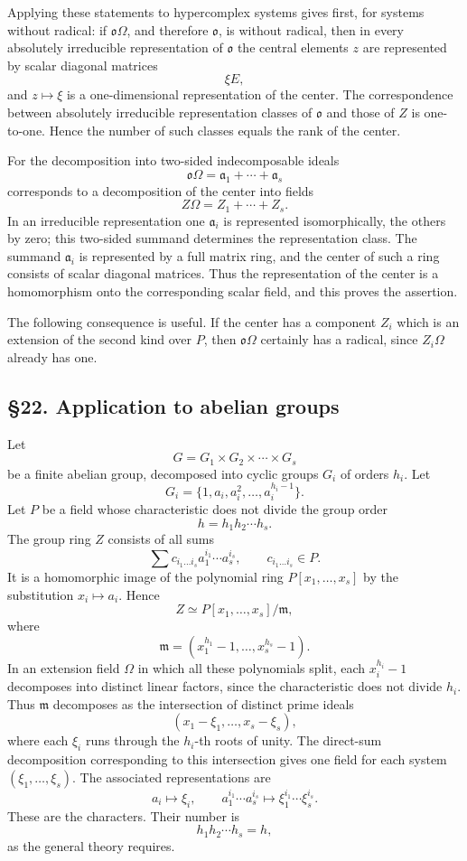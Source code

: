 \documentclass[
  11pt,
]{article}
\begin{document}
Applying these statements to hypercomplex systems gives first, for
systems without radical: if \(\mathfrak{o}\Omega\), and therefore
\(\mathfrak{o}\), is without radical, then in every absolutely
irreducible representation of \(\mathfrak{o}\) the central elements
\(z\) are represented by scalar diagonal matrices \[
  \xi E,
\] and \(z\mapsto \xi\) is a one-dimensional representation of the
center. The correspondence between absolutely irreducible representation
classes of \(\mathfrak{o}\) and those of \(Z\) is one-to-one. Hence the
number of such classes equals the rank of the center.

For the decomposition into two-sided indecomposable ideals \[
  \mathfrak{o}\Omega=\mathfrak a_1+\cdots+\mathfrak a_s
\] corresponds to a decomposition of the center into fields \[
  Z\Omega=Z_1+\cdots+Z_s.
\] In an irreducible representation one \(\mathfrak a_i\) is represented
isomorphically, the others by zero; this two-sided summand determines
the representation class. The summand \(\mathfrak a_i\) is represented
by a full matrix ring, and the center of such a ring consists of scalar
diagonal matrices. Thus the representation of the center is a
homomorphism onto the corresponding scalar field, and this proves the
assertion.

The following consequence is useful. If the center has a component
\(Z_i\) which is an extension of the second kind over \(P\), then
\(\mathfrak{o}\Omega\) certainly has a radical, since \(Z_i\Omega\)
already has one.

\subsection{§22. Application to abelian
groups}\label{application-to-abelian-groups}

Let \[
  G=G_1\times G_2\times\cdots\times G_s
\] be a finite abelian group, decomposed into cyclic groups \(G_i\) of
orders \(h_i\). Let \[
  G_i=\{1,a_i,a_i^2,\ldots,a_i^{h_i-1}\}.
\] Let \(P\) be a field whose characteristic does not divide the group
order \[
  h=h_1h_2\cdots h_s.
\] The group ring \(Z\) consists of all sums \[
  \sum c_{i_1\ldots i_s}a_1^{i_1}\cdots a_s^{i_s},
  \qquad c_{i_1\ldots i_s}\in P.
\] It is a homomorphic image of the polynomial ring
\(P[x_1,\ldots,x_s]\) by the substitution \(x_i\mapsto a_i\). Hence \[
  Z\simeq P[x_1,\ldots,x_s]/\mathfrak m,
\] where \[
  \mathfrak m=(x_1^{h_1}-1,\ldots,x_s^{h_s}-1).
\] In an extension field \(\Omega\) in which all these polynomials
split, each \(x_i^{h_i}-1\) decomposes into distinct linear factors,
since the characteristic does not divide \(h_i\). Thus \(\mathfrak m\)
decomposes as the intersection of distinct prime ideals \[
  (x_1-\xi_1,
    \ldots,
    x_s-\xi_s),
\] where each \(\xi_i\) runs through the \(h_i\)-th roots of unity. The
direct-sum decomposition corresponding to this intersection gives one
field for each system \((\xi_1,
\ldots,\xi_s)\). The associated representations are \[
  a_i\mapsto \xi_i,
  \qquad
  a_1^{i_1}\cdots a_s^{i_s}
     \mapsto \xi_1^{i_1}\cdots\xi_s^{i_s}.
\] These are the characters. Their number is \[
  h_1h_2\cdots h_s=h,
\] as the general theory requires.
\end{document}
